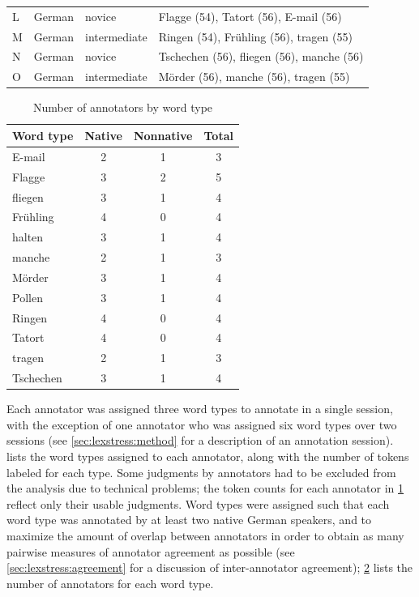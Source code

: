\begin{table}[htb]
\begin{tabularx}{\textwidth}{lllX}
		L & German	 & novice & Flagge (54),  Tatort (56),  E-mail (56) 	 \\
		
		M & 	German	 & intermediate & Ringen (54),  Fr\"{u}hling (56), tragen (55)	 \\
		
		N & German	& novice & Tschechen (56),  fliegen (56),  manche (56)	 \\
		
		O	& German	 & intermediate & Mörder (56),   manche (56),  tragen (55) \\
		
		\bottomrule
		\end{tabularx}
		\label{tab:annotators}
	\end{table}
	
	\begin{table}[htb]
		\centering
		\caption{Number of annotators by word type  }
		\begin{tabular}{lccc}
		\toprule
		Word type \TODO{(Tokens)} 
		&		Native %
		& 	Nonnative %
		& Total %
		\\
		\midrule
		E-mail	& 2 &	1 &	3 \\
		Flagge	& 3	& 2	& 5 \\
		fliegen	& 3	& 1	& 4 \\
		Frühling	& 4	& 0	& 4 \\
		halten	& 3	& 1	& 4 \\
		manche	& 2	& 1	& 3 \\
		Mörder & 	3	& 1	& 4 \\
		Pollen	& 3	& 1	& 4 \\
		Ringen	& 4	& 0	& 4 \\
		Tatort	& 4	& 0	& 4 \\
		tragen	& 2	& 1	& 3 \\
		Tschechen 	& 3	& 1	& 4 \\
		\bottomrule
		\end{tabular}
		\label{tab:annotatorsbyword}
	\end{table}
	
	
	Each annotator was assigned three word types to annotate in a single session, with the exception of one annotator who was assigned six word types over two sessions (see \cref{sec:lexstress:method} for a description of an annotation session).  lists the word types assigned to each annotator, along with the number of tokens labeled for each type. Some judgments by annotators  had to be excluded from the analysis due to technical problems; the token counts for each annotator in \cref{tab:annotators} reflect only their usable judgments.  Word types were assigned such that each word type was annotated by at least two native German speakers, and to maximize the amount of overlap between annotators in order to obtain as many pairwise measures of annotator agreement as possible (see \cref{sec:lexstress:agreement} for a discussion of inter-annotator agreement); \cref{tab:annotatorsbyword} lists the number of annotators for each word type.
	
